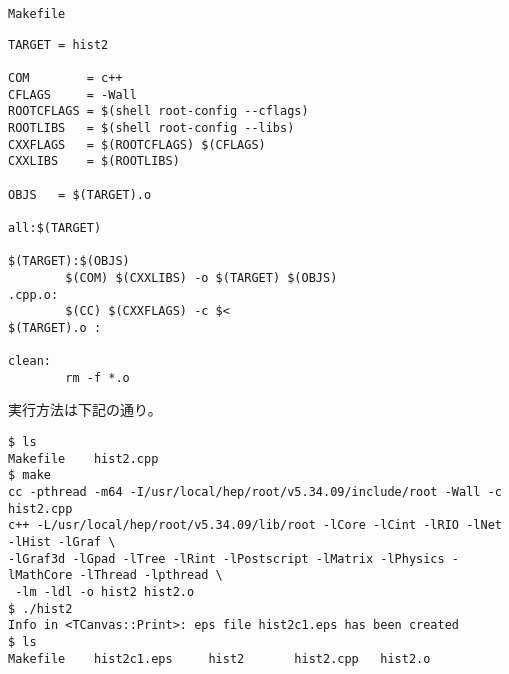      \begin{itembox}{\texttt{Makefile}}
\begin{verbatim}
TARGET = hist2

COM        = c++
CFLAGS     = -Wall
ROOTCFLAGS = $(shell root-config --cflags)
ROOTLIBS   = $(shell root-config --libs)
CXXFLAGS   = $(ROOTCFLAGS) $(CFLAGS)
CXXLIBS    = $(ROOTLIBS)

OBJS   = $(TARGET).o

all:$(TARGET)

$(TARGET):$(OBJS)
        $(COM) $(CXXLIBS) -o $(TARGET) $(OBJS)
.cpp.o:
        $(CC) $(CXXFLAGS) -c $<
$(TARGET).o :

clean:
        rm -f *.o
\end{verbatim}
     \end{itembox}
     実行方法は下記の通り。
\begin{verbatim}
$ ls
Makefile	hist2.cpp
$ make
cc -pthread -m64 -I/usr/local/hep/root/v5.34.09/include/root -Wall -c hist2.cpp
c++ -L/usr/local/hep/root/v5.34.09/lib/root -lCore -lCint -lRIO -lNet -lHist -lGraf \
-lGraf3d -lGpad -lTree -lRint -lPostscript -lMatrix -lPhysics -lMathCore -lThread -lpthread \
 -lm -ldl -o hist2 hist2.o
$ ./hist2 
Info in <TCanvas::Print>: eps file hist2c1.eps has been created
$ ls
Makefile	hist2c1.eps		hist2		hist2.cpp	hist2.o
\end{verbatim}

     
   \subsubsection{}

     \begin{itembox}{\texttt{}}
\begin{verbatim}
\end{verbatim}
     \end{itembox}
     \begin{itembox}{\texttt{}}
\begin{verbatim}
\end{verbatim}
     \end{itembox}
   
   
   \subsubsection{}
   
        \begin{itembox}{\texttt{}}
\begin{verbatim}
\end{verbatim}
     \end{itembox}
     \begin{itembox}{\texttt{}}
\begin{verbatim}
\end{verbatim}
     \end{itembox}
